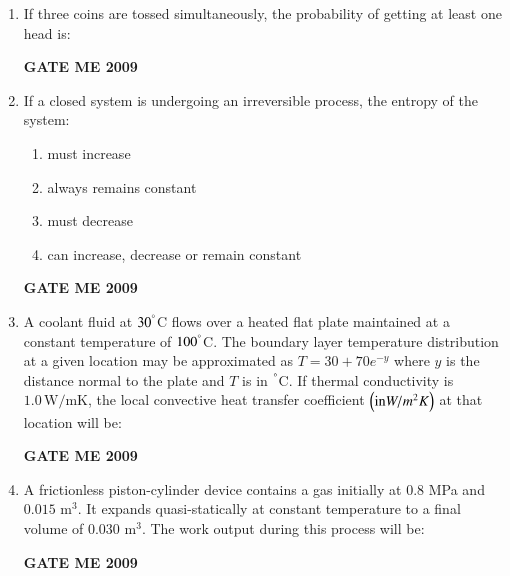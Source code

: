 \documentclass[journal]{IEEEtran}
\begin{document}
\begin{enumerate}[leftmargin=0pt]
\item If three coins are tossed simultaneously, the probability of getting at least one head is:
  \begin{enumerate}
  \end{enumerate}
  \hfill{\textbf{GATE ME 2009}}


\item If a closed system is undergoing an irreversible process, the entropy of the system:
  \begin{enumerate}
    \item must increase
    \item always remains constant
    \item must decrease
    \item can increase, decrease or remain constant
  \end{enumerate}
  \hfill{\textbf{GATE ME 2009}}

\item A coolant fluid at $30^\degree$C flows over a heated flat plate maintained at a constant temperature of $100^\degree$C. The boundary layer temperature distribution at a given location may be approximated as $T = 30 + 70 e^{-y}$ where $y$  is the distance normal to the plate and $T$ is in $^\degree$C. If thermal conductivity is $1.0\,\mathrm{W/mK}$, the local convective heat transfer coefficient $\left(\text{in} W/m^2K\right)$ at that location will be:
  \begin{enumerate}
  \end{enumerate}
  \hfill{\textbf{GATE ME 2009}}

\item A frictionless piston-cylinder device contains a gas initially at $0.8$ MPa and $0.015$ m$^3$. It expands quasi-statically at constant temperature to a final volume of $0.030$ m$^3$. The work output  during this process will be:
  \begin{enumerate}
  \end{enumerate}
  \hfill{\textbf{GATE ME 2009}}


\end{enumerate}
\end{document}
